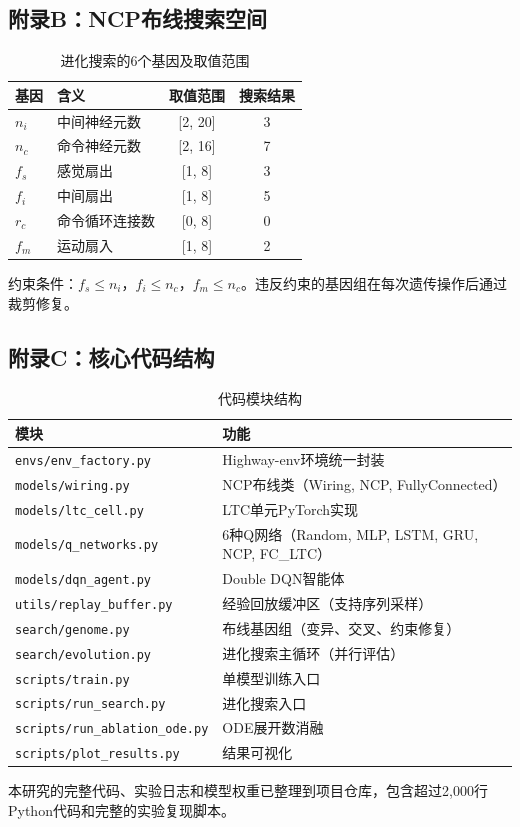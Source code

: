 \xiaosi

\subsection*{附录B：NCP布线搜索空间}

\wuhao
\begin{table}[H]
  \centering
  \caption{进化搜索的6个基因及取值范围}
  \label{tab:search_space}
  \begin{tabular}{llcc}
    \hline
    基因 & 含义 & 取值范围 & 搜索结果 \\
    \hline
    $n_i$ & 中间神经元数 & [2, 20] & 3 \\
    $n_c$ & 命令神经元数 & [2, 16] & 7 \\
    $f_s$ & 感觉扇出 & [1, 8] & 3 \\
    $f_i$ & 中间扇出 & [1, 8] & 5 \\
    $r_c$ & 命令循环连接数 & [0, 8] & 0 \\
    $f_m$ & 运动扇入 & [1, 8] & 2 \\
    \hline
  \end{tabular}
\end{table}

\xiaosi

约束条件：$f_s \leq n_i$，$f_i \leq n_c$，$f_m \leq n_c$。违反约束的基因组在每次遗传操作后通过裁剪修复。

\subsection*{附录C：核心代码结构}

\wuhao
\begin{table}[H]
  \centering
  \caption{代码模块结构}
  \label{tab:code_structure}
  \begin{tabular}{ll}
    \hline
    模块 & 功能 \\
    \hline
    \texttt{envs/env\_factory.py} & Highway-env环境统一封装 \\
    \texttt{models/wiring.py} & NCP布线类（Wiring, NCP, FullyConnected）\\
    \texttt{models/ltc\_cell.py} & LTC单元PyTorch实现 \\
    \texttt{models/q\_networks.py} & 6种Q网络（Random, MLP, LSTM, GRU, NCP, FC\_LTC）\\
    \texttt{models/dqn\_agent.py} & Double DQN智能体 \\
    \texttt{utils/replay\_buffer.py} & 经验回放缓冲区（支持序列采样）\\
    \texttt{search/genome.py} & 布线基因组（变异、交叉、约束修复）\\
    \texttt{search/evolution.py} & 进化搜索主循环（并行评估）\\
    \texttt{scripts/train.py} & 单模型训练入口 \\
    \texttt{scripts/run\_search.py} & 进化搜索入口 \\
    \texttt{scripts/run\_ablation\_ode.py} & ODE展开数消融 \\
    \texttt{scripts/plot\_results.py} & 结果可视化 \\
    \hline
  \end{tabular}
\end{table}

\xiaosi

本研究的完整代码、实验日志和模型权重已整理到项目仓库，包含超过2,000行Python代码和完整的实验复现脚本。

